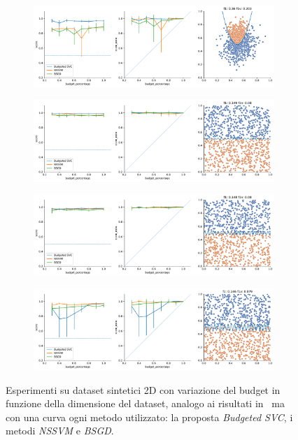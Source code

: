 \begin{figure}
\begin{subfigure}{.5\textwidth}
    \end{subfigure}%
    \hfill
    \begin{subfigure}{.5\textwidth}
        \centering
        \includegraphics[width=\textwidth]{img/comp_old/5.pdf}
    \end{subfigure}
    \begin{subfigure}{.5\textwidth}
        \centering
        \includegraphics[width=\textwidth]{img/comp_old/6.pdf}
    \end{subfigure}%
    \hfill
    \begin{subfigure}{.5\textwidth}
        \centering
        \includegraphics[width=\textwidth]{img/comp_old/7.pdf}
    \end{subfigure}
    \begin{subfigure}{.5\textwidth}
        \centering
        \includegraphics[width=\textwidth]{img/comp_old/8.pdf}
    \end{subfigure}
\caption{Esperimenti su dataset sintetici 2D con variazione del budget in funzione della dimensione del dataset, analogo ai risultati in~ ma con una curva ogni metodo utilizzato: la proposta \emph{Budgeted SVC}, i metodi \emph{NSSVM} e \emph{BSGD}.}
\label{fig:comp_old_1}
\end{figure}   
